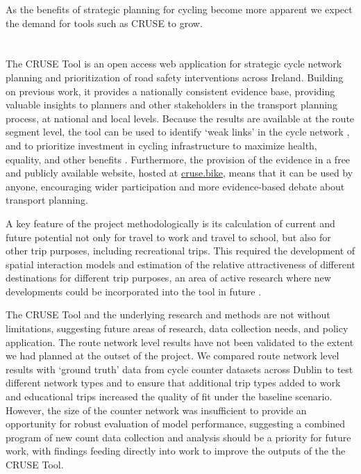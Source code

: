 \documentclass[
  super,
  preprint,
  3p]{elsarticle}
\providecommand{\DIFadd}[1]{{\protect\color{blue}\uwave{#1}}} %
\providecommand{\DIFaddbegin}{} %
\providecommand{\DIFaddend}{} %
\providecommand{\DIFdelbegin}{} %
\providecommand{\DIFdelend}{} %
\newcommand{\DIFscaledelfig}{0.5}
\newlength{\DIFdelgraphicswidth} %
\newlength{\DIFdelgraphicsheight} %
\newcommand{\DIFaddincludegraphics}[2][]{{\color{blue}\fbox{\DIFOincludegraphics[#1]{#2}}}} %
\newcommand{\DIFdelincludegraphics}[2][]{%
\sbox{\DIFdelgraphicsbox}{\DIFOincludegraphics[#1]{#2}}%
\settoboxwidth{\DIFdelgraphicswidth}{\DIFdelgraphicsbox} %
\settoboxtotalheight{\DIFdelgraphicsheight}{\DIFdelgraphicsbox} %
\scalebox{\DIFscaledelfig}{%
\parbox[b]{\DIFdelgraphicswidth}{\usebox{\DIFdelgraphicsbox}\\[-\baselineskip] \rule{\DIFdelgraphicswidth}{0em}}\llap{\resizebox{\DIFdelgraphicswidth}{\DIFdelgraphicsheight}{%
\setlength{\unitlength}{\DIFdelgraphicswidth}%
\begin{picture}(1,1)%
\thicklines\linethickness{2pt} %
{\color[rgb]{1,0,0}\put(0,0){\framebox(1,1){}}}%
{\color[rgb]{1,0,0}\put(0,0){\line( 1,1){1}}}%
{\color[rgb]{1,0,0}\put(0,1){\line(1,-1){1}}}%
\end{picture}%
}\hspace*{3pt}}} %
} %
\DeclareRobustCommand{\DIFaddbegin}{\DIFOaddbegin \let\includegraphics\DIFaddincludegraphics} %
\DeclareRobustCommand{\DIFaddend}{\DIFOaddend \let\includegraphics\DIFOincludegraphics} %
\DeclareRobustCommand{\DIFdelbegin}{\DIFOdelbegin \let\includegraphics\DIFdelincludegraphics} %
\DeclareRobustCommand{\DIFdelend}{\DIFOaddend \let\includegraphics\DIFOincludegraphics} %
\begin{document}
As the benefits of strategic planning for cycling become more apparent
\citep{scappini2022} we expect the demand for tools such as CRUSE to
grow.

\DIFdelbegin %
\DIFdelend \DIFaddbegin \section{\DIFadd{Conclusions}}\label{sec-conclusions}
\DIFaddend 

The CRUSE Tool is an open access web application for strategic cycle
network planning and prioritization of road safety interventions across
Ireland. Building on previous work, it provides a nationally consistent
evidence base, providing valuable insights to planners and other
stakeholders in the transport planning process, at national and local
levels. Because the results are available at the route segment level,
the tool can be used to identify `weak links' in the cycle network
\citep{vybornova2022}, and to prioritize investment in cycling
infrastructure to maximize health, equality, and other benefits
\citep{mahfouz, woodcock2021}. Furthermore, the provision of the
evidence in a free and publicly available website, hosted at
\href{https://cruse.bike}{cruse.bike}, means that it can be used by
anyone, encouraging wider participation and more evidence-based debate
about transport planning.

A key feature of the project methodologically is its calculation of
current and future potential not only for travel to work and travel to
school, but also for other trip purposes, including recreational trips.
This required the development of spatial interaction models and
estimation of the relative attractiveness of different destinations for
different trip purposes, an area of active research where new
developments could be incorporated into the tool in future
\citep{hasova2022}.

The CRUSE Tool and the underlying research and methods are not without
limitations, suggesting future areas of research, data collection needs,
and policy application. The route network level results have not been
validated to the extent we had planned at the outset of the project. We
compared route network level results with `ground truth' data from cycle
counter datasets across Dublin to test different network types and to
ensure that additional trip types added to work and educational trips
increased the quality of fit under the baseline scenario. However, the
size of the counter network was insufficient to provide an opportunity
for robust evaluation of model performance, suggesting a combined
program of new count data collection and analysis should be a priority
for future work, with findings feeding directly into work to improve the
outputs of the the CRUSE Tool.
\end{document}
